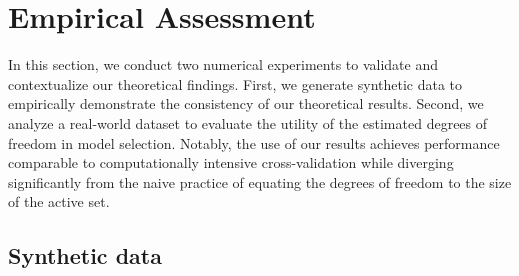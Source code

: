 \documentclass[a4paper, 12pt]{article}
\begin{document}
\section{Empirical Assessment}
\label{sec:exper}

In this section, we conduct two numerical experiments to validate and contextualize our theoretical findings. First, we generate synthetic data to empirically demonstrate the consistency of our theoretical results. Second, we analyze a real-world dataset to evaluate the utility of the estimated degrees of freedom in model selection. Notably, the use of our results  achieves performance comparable to computationally intensive cross-validation while diverging significantly from the naive practice of equating the degrees of freedom to the size of the active set.
%
\subsection{Synthetic data}
\label{subsec:syntheticdata}
\end{document}
